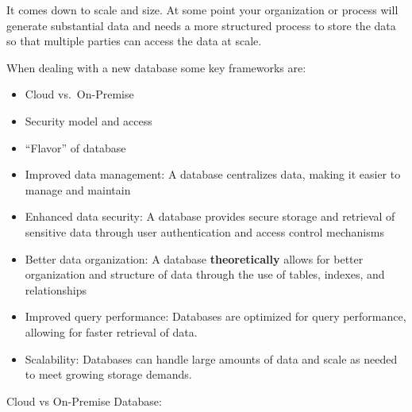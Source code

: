 \documentclass[
  letterpaper,
  DIV=11,
  numbers=noendperiod]{scrreprt}
\begin{document}
\begin{tcolorbox}[enhanced jigsaw, opacitybacktitle=0.6, bottomtitle=1mm, arc=.35mm, bottomrule=.15mm, title=\textcolor{quarto-callout-note-color}{\faInfo}\hspace{0.5em}{``What is the advantage of a database?''}, colframe=quarto-callout-note-color-frame, toptitle=1mm, coltitle=black, rightrule=.15mm, breakable, left=2mm, titlerule=0mm, toprule=.15mm, leftrule=.75mm, opacityback=0, colbacktitle=quarto-callout-note-color!10!white, colback=white]

It comes down to scale and size. At some point your organization or
process will generate substantial data and needs a more structured
process to store the data so that multiple parties can access the data
at scale.

When dealing with a new database some key frameworks are:

\begin{itemize}
\item
  Cloud vs.~On-Premise
\item
  Security model and access
\item
  ``Flavor'' of database
\item
  Improved data management: A database centralizes data, making it
  easier to manage and maintain
\item
  Enhanced data security: A database provides secure storage and
  retrieval of sensitive data through user authentication and access
  control mechanisms
\item
  Better data organization: A database \textbf{theoretically} allows for
  better organization and structure of data through the use of tables,
  indexes, and relationships
\item
  Improved query performance: Databases are optimized for query
  performance, allowing for faster retrieval of data.
\item
  Scalability: Databases can handle large amounts of data and scale as
  needed to meet growing storage demands.
\end{itemize}

Cloud vs On-Premise Database:


\end{tcolorbox}
\end{document}

